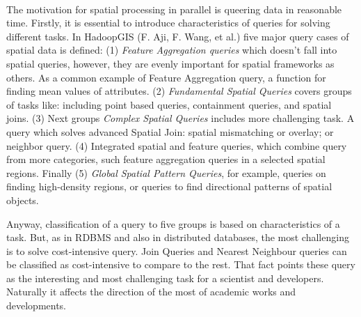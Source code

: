 \documentclass[a4paper,12pt,oneside]{report}
\begin{document}
\paragraph{}

The motivation for spatial processing in parallel is queering data in reasonable time. 
Firstly, it is essential to introduce characteristics of queries for solving different 
tasks. In HadoopGIS (F. Aji, F. Wang, et al.\cite{hadoopGIS})  five major 
query cases of spatial data is defined: (1) \textit{Feature Aggregation queries}  which doesn’t 
fall into spatial queries, however, they are evenly important for spatial frameworks 
as others. As a common example of Feature Aggregation query, a function for finding mean 
values of attributes. 
(2) \textit{Fundamental Spatial Queries} covers groups of tasks like: including point based 
queries, containment queries, and spatial joins. (3) Next groups 
\textit{ Complex Spatial Queries} includes more challenging task. A query which solves 
advanced Spatial Join: spatial mismatching or overlay; or neighbor query. (4) Integrated 
spatial and feature queries, which combine query from more categories, such feature 
aggregation queries in a selected spatial regions. Finally (5) \textit{Global
Spatial Pattern Queries}, for example, queries on finding high-density regions, or 
queries to find directional patterns of spatial objects.

Anyway, classification of a query to five groups is based on characteristics of a task. 
But, as in RDBMS and also in distributed databases, the most challenging is to solve  cost-intensive query. 
Join Queries and Nearest Neighbour queries can be classified as 
cost-intensive to compare to the rest. That fact points these query as the interesting and
most challenging task for a scientist and developers. Naturally it affects the direction of the most of academic works and developments.
\end{document}
